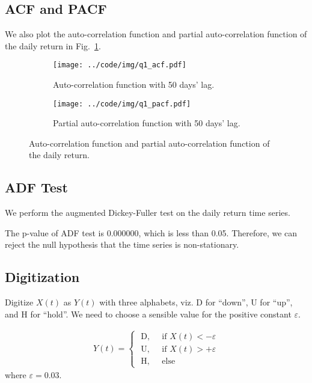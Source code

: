 \documentclass[runningheads]{llncs}
\begin{document}
\subsection{ACF and PACF}

We also plot the auto-correlation function and partial auto-correlation function of the daily return in Fig.~\ref{fig:q1acf}.

\begin{figure}[!htbp]
    \begin{subfigure}[t]{0.49\textwidth}
        \centering
        \texttt{[image: ../code/img/q1\_acf.pdf]}
        \caption{Auto-correlation function with 50 days' lag.}
    \end{subfigure}
    \begin{subfigure}[t]{0.49\textwidth}
        \centering
        \texttt{[image: ../code/img/q1\_pacf.pdf]}
        \caption{Partial auto-correlation function with 50 days' lag.}
    \end{subfigure}
    \caption{Auto-correlation function and partial auto-correlation function of the daily return.}
    \label{fig:q1acf}
\end{figure}

\subsection{ADF Test}

We perform the augmented Dickey-Fuller test on the daily return time series.

The p-value of ADF test is 0.000000, which is less than 0.05. Therefore, we can reject the null hypothesis that the time series is non-stationary.

\subsection{Digitization}

Digitize $X(t)$ as $Y(t)$ with three alphabets, viz. D for “down”, U for “up”, and H for “hold”. We need to choose a sensible value for the positive constant $\varepsilon$.

\begin{align}
    Y(t)=\left\{
    \begin{array}{ll}
        \text { D, } & \text { if } X(t)<-\varepsilon \\
        \text { U, } & \text { if } X(t)>+\varepsilon \\
        \text { H, } & \text { else }
    \end{array}
    \right.
\end{align}
where $\varepsilon=0.03$.
\end{document}
